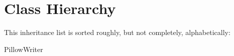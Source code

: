 \section{Class Hierarchy}
This inheritance list is sorted roughly, but not completely, alphabetically\+:\begin{DoxyCompactList}
\item Pillow\+Writer\begin{DoxyCompactList}
\item {}
\item {}
\end{DoxyCompactList}
\end{DoxyCompactList}
